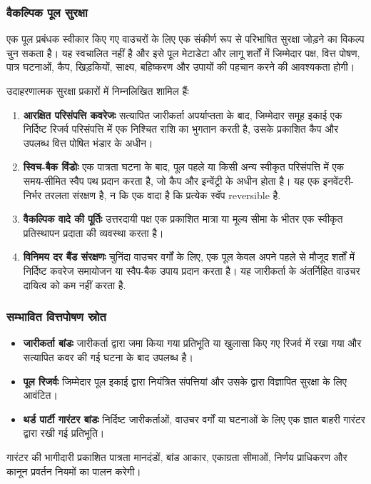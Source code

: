 \documentclass[11pt]{article}
\begin{document}
\subsubsection*{वैकल्पिक पूल सुरक्षा}

एक पूल प्रबंधक स्वीकार किए गए वाउचरों के लिए एक संकीर्ण रूप से परिभाषित सुरक्षा जोड़ने का विकल्प चुन सकता है। यह स्वचालित नहीं है और इसे पूल मेटाडेटा और लागू शर्तों में जिम्मेदार पक्ष, वित्त पोषण, पात्र घटनाओं, कैप, खिड़कियों, साक्ष्य, बहिष्करण और उपायों की पहचान करने की आवश्यकता होगी।

उदाहरणात्मक सुरक्षा प्रकारों में निम्नलिखित शामिल हैंः

\begin{enumerate}[leftmargin=*]
\item \textbf{आरक्षित परिसंपत्ति कवरेजः} सत्यापित जारीकर्ता अपर्याप्तता के बाद, जिम्मेदार समूह इकाई एक निर्दिष्ट रिजर्व परिसंपत्ति में एक निश्चित राशि का भुगतान करती है, उसके प्रकाशित कैप और उपलब्ध वित्त पोषित भंडार के अधीन।
\item \textbf{स्विच-बैक विंडोः} एक पात्रता घटना के बाद, पूल पहले या किसी अन्य स्वीकृत परिसंपत्ति में एक समय-सीमित स्वैप पथ प्रदान करता है, जो कैप और इन्वेंट्री के अधीन होता है। यह एक इनवेंटरी-निर्भर तरलता संरक्षण है, न कि एक वादा है कि प्रत्येक स्वॅप reversible है.
\item \textbf{वैकल्पिक वादे की पूर्तिः} उत्तरदायी पक्ष एक प्रकाशित मात्रा या मूल्य सीमा के भीतर एक स्वीकृत प्रतिस्थापन प्रदाता की व्यवस्था करता है।
\item \textbf{विनिमय दर बैंड संरक्षणः} चुनिंदा वाउचर वर्गों के लिए, एक पूल केवल अपने पहले से मौजूद शर्तों में निर्दिष्ट कवरेज समायोजन या स्वैप-बैक उपाय प्रदान करता है। यह जारीकर्ता के अंतर्निहित वाउचर दायित्व को कम नहीं करता है.
\end{enumerate}
\subsubsection*{सम्भावित वित्तपोषण स्रोत}

\begin{itemize}[leftmargin=*]
\item \textbf{जारीकर्ता बांडः} जारीकर्ता द्वारा जमा किया गया प्रतिभूति या खुलासा किए गए रिजर्व में रखा गया और सत्यापित कवर की गई घटना के बाद उपलब्ध है।
\item \textbf{पूल रिजर्वः} जिम्मेदार पूल इकाई द्वारा नियंत्रित संपत्तियां और उसके द्वारा विज्ञापित सुरक्षा के लिए आवंटित।
\item \textbf{थर्ड पार्टी गारंटर बांडः} निर्दिष्ट जारीकर्ताओं, वाउचर वर्गों या घटनाओं के लिए एक ज्ञात बाहरी गारंटर द्वारा रखी गई प्रतिभूति।
\end{itemize}
गारंटर की भागीदारी प्रकाशित पात्रता मानदंडों, बांड आकार, एकाग्रता सीमाओं, निर्णय प्राधिकरण और कानून प्रवर्तन नियमों का पालन करेगी।
\end{document}
